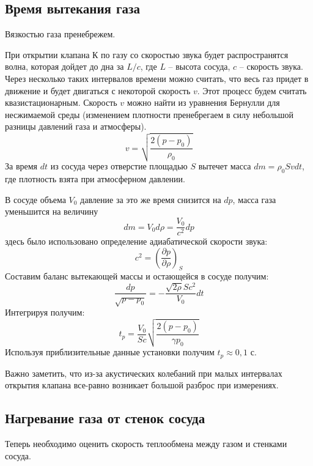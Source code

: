 \documentclass[a4paper,12pt]{article}
\begin{document}
    \subsection*{Время вытекания газа}
    Вязкостью газа пренебрежем.

    При открытии клапана К по газу со скоростью звука будет распространятся волна, которая дойдет до дна за $L/c$, где $L$ -- высота сосуда, $c$ -- скорость звука. Через несколько таких интервалов времени можно считать, что весь газ придет в движение и будет двигаться с некоторой скорость $v$. Этот процесс будем считать квазистационарным. Скорость $v$ можно найти из уравнения Бернулли для несжимаемой среды (изменением плотности пренебрегаем в силу небольшой разницы давлений газа и атмосферы).
    \begin{equation}
        \label{v}
        v=\sqrt{\frac{2(p-p_0)}{\rho_0}}
    \end{equation}
    За время $dt$ из сосуда через отверстие площадью $S$ вытечет масса $dm=\rho_0 S vdt$, где плотность взята при атмосферном давлении.

    В сосуде объема $V_0$ давление за это же время снизится на $dp$, масса газа уменьшится на величину
    \begin{equation*}
        dm=V_0d\rho=\frac{V_0}{c^2}dp
    \end{equation*}
    здесь было использовано определение адиабатической скорости звука:
    \begin{equation*}
        c^2=\left(\frac{\partial p}{\partial \rho}\right)_S
    \end{equation*}
    Составим баланс вытекающей массы и остающейся в сосуде получим:
    \begin{equation*}
        \frac{dp}{\sqrt{p-p_0}}=-\frac{\sqrt{2\rho}Sc^2}{V_0}dt
    \end{equation*}
    Интегрируя получим:
    \begin{equation}
        \label{t_p}
        t_p=\frac{V_0}{Sc}\sqrt{\frac{2(p-p_0)}{\gamma p_0}}
    \end{equation}
    Используя приблизительные данные установки получим $t_p\approx 0,1$ с.

    Важно заметить, что из-за акустических колебаний при малых интервалах открытия клапана все-равно возникает большой разброс при измерениях. 

    \subsection*{Нагревание газа от стенок сосуда} Теперь необходимо оценить скорость теплообмена между газом и стенками сосуда.
\end{document}
